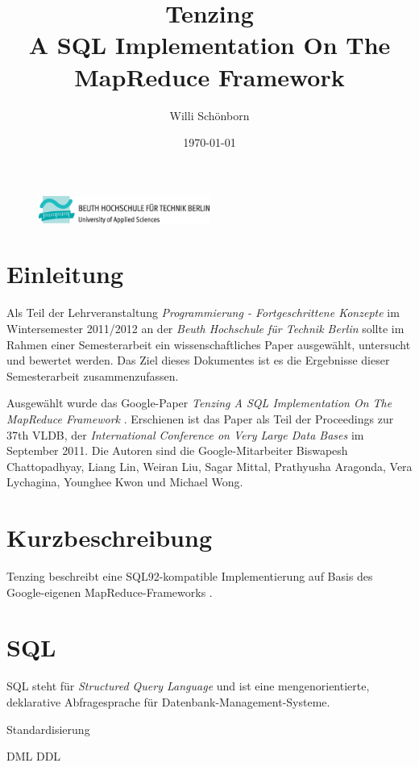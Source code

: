 \documentclass[a4paper]{article}
\title{Tenzing \\ A SQL Implementation On The MapReduce Framework}
\author{Willi Schönborn}
\date{\today}
\begin{document}
\begin{figure}[H]
\centering
\includegraphics[width=0.5\textwidth]{beuth.eps}
\maketitle
\end{figure}

\newpage

\tableofcontents

\newpage

\section{Einleitung}
Als Teil der Lehrveranstaltung \textit{Programmierung - Fortgeschrittene Konzepte} im Wintersemester 2011/2012 an der \textit{Beuth Hochschule für Technik Berlin} sollte im Rahmen einer Semesterarbeit ein wissenschaftliches Paper ausgewählt, untersucht und bewertet werden. Das Ziel dieses Dokumentes ist es die Ergebnisse dieser Semesterarbeit zusammenzufassen.

Ausgewählt wurde das Google-Paper \textit{Tenzing A SQL Implementation On The MapReduce Framework} \cite{TENZING}. Erschienen ist das Paper als Teil der Proceedings zur 37th VLDB, der \textit{International Conference on Very Large Data Bases} im September 2011. Die Autoren sind die Google-Mitarbeiter Biswapesh Chattopadhyay, Liang Lin, Weiran Liu, Sagar Mittal, Prathyusha Aragonda, Vera Lychagina, Younghee Kwon und Michael Wong.

\section{Kurzbeschreibung}
Tenzing beschreibt eine SQL92-kompatible Implementierung auf Basis des Google-eigenen MapReduce-Frameworks \cite{MAPREDUCE}.

\newpage

\section{SQL}
SQL steht für \textit{Structured Query Language} und ist eine mengenorientierte, deklarative Abfragesprache für Datenbank-Management-Systeme.

Standardisierung

DML
DDL
\end{document}
